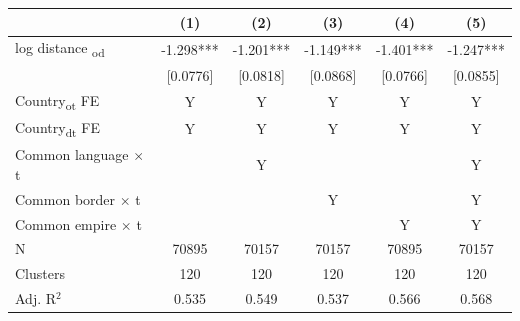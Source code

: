 {
\def\sym#1{\ifmmode^{#1}\else\(^{#1}\)\fi}
\begin{tabular}{l*{5}{c}}
\toprule
            &\multicolumn{1}{c}{(1)}   &\multicolumn{1}{c}{(2)}   &\multicolumn{1}{c}{(3)}   &\multicolumn{1}{c}{(4)}   &\multicolumn{1}{c}{(5)}   \\
\midrule
log distance \textsubscript{od}&      -1.298***&      -1.201***&      -1.149***&      -1.401***&      -1.247***\\
            &    [0.0776]   &    [0.0818]   &    [0.0868]   &    [0.0766]   &    [0.0855]   \\\hline
Country\textsubscript{ot} FE&           Y   &           Y   &           Y   &           Y   &           Y   \\
Country\textsubscript{dt} FE&           Y   &           Y   &           Y   &           Y   &           Y   \\
Common language $\times$ t&               &           Y   &               &               &           Y   \\
Common border $\times$ t&               &               &           Y   &               &           Y   \\
Common empire $\times$ t&               &               &               &           Y   &           Y   \\
\midrule
N           &       70895   &       70157   &       70157   &       70895   &       70157   \\
Clusters    &         120   &         120   &         120   &         120   &         120   \\
Adj. R{$^2$}&       0.535   &       0.549   &       0.537   &       0.566   &       0.568   \\
\bottomrule
\end{tabular}
}
